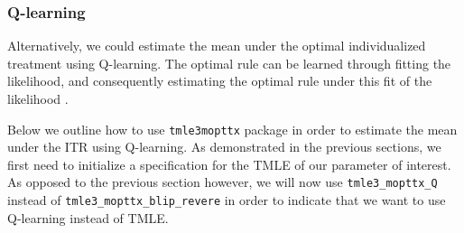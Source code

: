 \documentclass[12pt, krantz2,]{krantz}
\newenvironment{Shaded}{\begin{snugshade}}{\end{snugshade}}
\newcommand{\CommentTok}[1]{\textcolor[rgb]{0.37,0.37,0.37}{\textit{#1}}}
\newcommand{\DecValTok}[1]{\textcolor[rgb]{0.06,0.06,0.06}{#1}}
\newcommand{\FloatTok}[1]{\textcolor[rgb]{0.06,0.06,0.06}{#1}}
\newcommand{\KeywordTok}[1]{\textcolor[rgb]{0.27,0.27,0.27}{\textbf{#1}}}
\newcommand{\NormalTok}[1]{#1}
\newcommand{\OperatorTok}[1]{\textcolor[rgb]{0.43,0.43,0.43}{\textbf{#1}}}
\newcommand{\OtherTok}[1]{\textcolor[rgb]{0.37,0.37,0.37}{#1}}
\newcommand{\StringTok}[1]{\textcolor[rgb]{0.5,0.5,0.5}{#1}}
\theoremstyle{definition}
\theoremstyle{definition}
\theoremstyle{definition}
\newcommand{\1}{\mathbbm{1}}
\begin{document}
\begin{Shaded}
\end{Shaded}

\hypertarget{q-learning}{%
\subsubsection{Q-learning}\label{q-learning}}

Alternatively, we could estimate the mean under the optimal individualized
treatment using Q-learning. The optimal rule can be learned through fitting the
likelihood, and consequently estimating the optimal rule under this fit of the
likelihood \citep[\citet{murphy2003}]{Sutton1998}.

Below we outline how to use \texttt{tmle3mopttx} package in order to estimate the mean
under the ITR using Q-learning. As demonstrated in the previous sections, we
first need to initialize a specification for the TMLE of our parameter of
interest. As opposed to the previous section however, we will now use
\texttt{tmle3\_mopttx\_Q} instead of \texttt{tmle3\_mopttx\_blip\_revere} in order to indicate that
we want to use Q-learning instead of TMLE.
\end{document}
